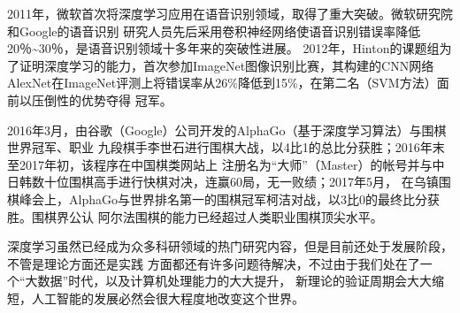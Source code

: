   2011年，微软首次将深度学习应用在语音识别领域，取得了重大突破。微软研究院和Google的语音识别
  研究人员先后采用卷积神经网络使语音识别错误率降低20％\textasciitilde30％，是语音识别领域十多年来的突破性进展。
  2012年，Hinton的课题组为了证明深度学习的能力，首次参加ImageNet图像识别比赛，其构建的CNN网络
  AlexNet在ImageNet评测上将错误率从26\%降低到15\%，在第二名（SVM方法）面前以压倒性的优势夺得
  冠军。


  2016年3月，由谷歌（Google）公司开发的AlphaGo（基于深度学习算法）与围棋世界冠军、职业
  九段棋手李世石进行围棋大战，以4比1的总比分获胜；2016年末至2017年初，该程序在中国棋类网站上
  注册名为“大师”（Master）的帐号并与中日韩数十位围棋高手进行快棋对决，连赢60局，无一败绩；2017年5月，
  在乌镇围棋峰会上，AlphaGo与世界排名第一的围棋冠军柯洁对战，以3比0的最终比分获胜。围棋界公认
  阿尔法围棋的能力已经超过人类职业围棋顶尖水平。

  深度学习虽然已经成为众多科研领域的热门研究内容，但是目前还处于发展阶段，不管是理论方面还是实践
  方面都还有许多问题待解决，不过由于我们处在了一个“大数据”时代，以及计算机处理能力的大大提升，
  新理论的验证周期会大大缩短，人工智能的发展必然会很大程度地改变这个世界。
